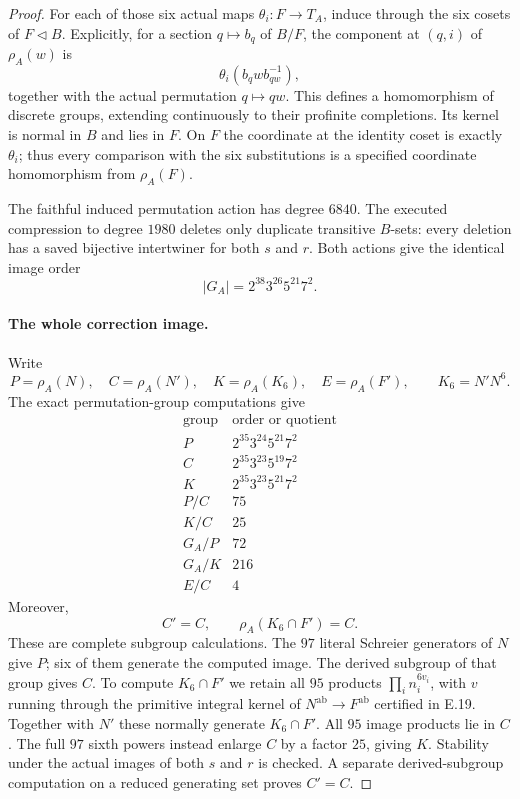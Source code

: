 \begin{proof}
For each of those six actual maps $\theta_i:F\to T_A$,
induce through the six cosets of $F\lhd B$. Explicitly,
for a section $q\mapsto b_q$ of $B/F$, the component at
$(q,i)$ of $\rho_A(w)$ is
\[
 \theta_i(b_qwb_{qw}^{-1}),
 \tag{E.29.4}
\]
together with the actual permutation $q\mapsto qw$.
This defines a homomorphism of discrete groups, extending
continuously to their profinite completions. Its kernel
is normal in $B$ and lies in $F$. On $F$ the coordinate
at the identity coset is exactly $\theta_i$; thus every
comparison with the six substitutions is a specified
coordinate homomorphism from $\rho_A(F)$.

The faithful induced permutation action has degree $6840$.
The executed compression to degree $1980$ deletes only
duplicate transitive $B$-sets: every deletion has a saved
bijective intertwiner for both $s$ and $r$. Both actions
give the identical image order
\[
 |G_A|=2^{38}3^{26}5^{21}7^2.
 \tag{E.29.5}
\]

\paragraph{The whole correction image.}
Write
\[
 P=\rho_A(N),\quad C=\rho_A(N'),\quad
 K=\rho_A(K_6),\quad E=\rho_A(F'),
 \qquad K_6=N'N^6.
\]
The exact permutation-group computations give
\[
 \begin{array}{c|c}
 \text{group}&\text{order or quotient}\\\hline
 P&2^{35}3^{24}5^{21}7^2\\
 C&2^{35}3^{23}5^{19}7^2\\
 K&2^{35}3^{23}5^{21}7^2\\
 P/C&75\\
 K/C&25\\
 G_A/P&72\\
 G_A/K&216\\
 E/C&4
 \end{array}
 \tag{E.29.6}
\]
Moreover,
\[
 C'=C,\qquad \rho_A(K_6\cap F')=C.
 \tag{E.29.7}
\]
These are complete subgroup calculations. The $97$
literal Schreier generators of $N$ give $P$; six of them
generate the computed image. The derived subgroup of
that group gives $C$. To compute $K_6\cap F'$ we retain
all $95$ products $\prod_i n_i^{6v_i}$, with $v$ running
through the primitive integral kernel of
$N^{\mathrm{ab}}\to F^{\mathrm{ab}}$ certified in E.19.
Together with $N'$ these normally generate
$K_6\cap F'$. All $95$ image products lie in $C$.
The full $97$ sixth powers instead enlarge $C$ by a
factor $25$, giving $K$. Stability under the actual
images of both $s$ and $r$ is checked. A separate
derived-subgroup computation on a reduced generating
set proves $C'=C$.


\end{proof}
